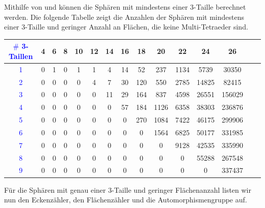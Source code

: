 \documentclass[12pt,titlepage,twoside,cleardoublepage]{article}
\theoremstyle{nummermitklammern}
\numberwithin{equation}{section}
\begin{document}
Mithilfe von \cite{reygap} und \cite{gapsimp} können die Sphären mit mindestens einer 3-Taille berechnet werden. Die folgende Tabelle zeigt die Anzahlen der Sphären mit mindestens einer 3-Taille und geringer Anzahl an Flächen, die keine Multi-Tetraeder sind. 
\begin{center}
\begin{tabular}{|c|c|c|c|c|c|c|c|c|c|c|c|c|c|c|}
\hline
\textcolor{blue}{$\#$ 3-Taillen }&\textbf{4}& \textbf{6}& \textbf{8}& \textbf{10}& \textbf{12}& \textbf{14}& \textbf{16}& \textbf{18}& \textbf{20}& \textbf{22}& \textbf{24}& \textbf{26}\\
\hline
\textcolor{blue}{1} &0& 1& 0& 1& 1& 4& 14& 52& 237& 1134& 5739& 30350\\
\hline
\textcolor{blue}{2} &0& 0& 0 &0& 4& 7& 30& 120& 550& 2785& 14825& 82415\\
\hline
\textcolor{blue}{3}& 0& 0& 0& 0& 0& 11& 29& 164& 837& 4598& 26551& 156029\\
\hline
\textcolor{blue}{4}& 0& 0& 0& 0& 0& 0& 57& 184& 1126& 6358& 38303& 236876\\
\hline
\textcolor{blue}{5}& 0& 0& 0& 0& 0& 0& 0& 270& 1084& 7422& 46175& 299906\\
\hline
\textcolor{blue}{6} &0& 0& 0& 0& 0& 0& 0& 0 &1564& 6825& 50177& 331985\\
\hline
\textcolor{blue}{7}& 0& 0& 0& 0& 0& 0& 0& 0& 0& 9128& 42535& 335990\\
\hline
\textcolor{blue}{8}& 0& 0& 0& 0& 0& 0& 0& 0& 0& 0& 55288& 267548\\
\hline
\textcolor{blue}{9} &0& 0& 0& 0& 0& 0& 0& 0& 0& 0& 0& 337437\\
\hline
\end{tabular}
\end{center}

Für die Sphären mit genau einer 3-Taille und geringer Flächenanzahl listen wir nun den Eckenzähler, den Flächenzähler und die Automorphismengruppe auf.
\end{document}
